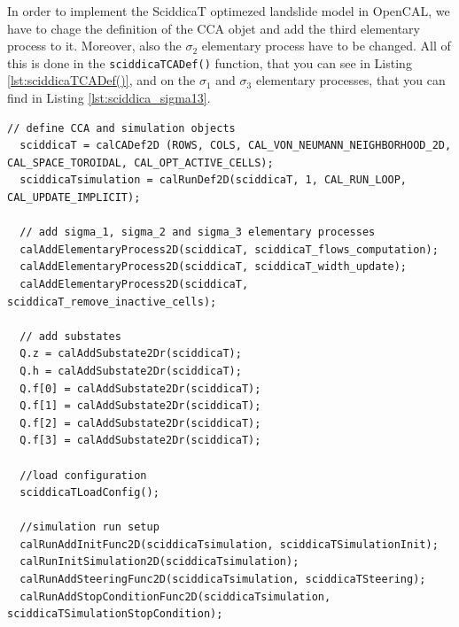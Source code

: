 In order to implement the SciddicaT optimezed landslide model in
OpenCAL, we have to chage the definition of the CCA objet and add the
third elementary process to it. Moreover, also the $\sigma_2$
elementary process have to be changed. All of this is done in the
\verb'sciddicaTCADef()' function, that you can see in Listing
\ref{lst:sciddicaTCADef()}, and on the $\sigma_1$ and $\sigma_3$
elementary processes, that you can find in Listing
\ref{lst:sciddica_sigma13}.

\begin{lstlisting}[float,floatplacement=H, label=lst:sciddicaTCADef(), caption=The sciddicaTCADef() definition function.]
  // define CCA and simulation objects
  sciddicaT = calCADef2D (ROWS, COLS, CAL_VON_NEUMANN_NEIGHBORHOOD_2D, CAL_SPACE_TOROIDAL, CAL_OPT_ACTIVE_CELLS);
  sciddicaTsimulation = calRunDef2D(sciddicaT, 1, CAL_RUN_LOOP, CAL_UPDATE_IMPLICIT);

  // add sigma_1, sigma_2 and sigma_3 elementary processes
  calAddElementaryProcess2D(sciddicaT, sciddicaT_flows_computation);
  calAddElementaryProcess2D(sciddicaT, sciddicaT_width_update);
  calAddElementaryProcess2D(sciddicaT, sciddicaT_remove_inactive_cells);

  // add substates
  Q.z = calAddSubstate2Dr(sciddicaT);
  Q.h = calAddSubstate2Dr(sciddicaT);
  Q.f[0] = calAddSubstate2Dr(sciddicaT);
  Q.f[1] = calAddSubstate2Dr(sciddicaT);
  Q.f[2] = calAddSubstate2Dr(sciddicaT);
  Q.f[3] = calAddSubstate2Dr(sciddicaT);

  //load configuration
  sciddicaTLoadConfig();

  //simulation run setup
  calRunAddInitFunc2D(sciddicaTsimulation, sciddicaTSimulationInit);
  calRunInitSimulation2D(sciddicaTsimulation);
  calRunAddSteeringFunc2D(sciddicaTsimulation, sciddicaTSteering);
  calRunAddStopConditionFunc2D(sciddicaTsimulation, sciddicaTSimulationStopCondition);
\end{lstlisting}

